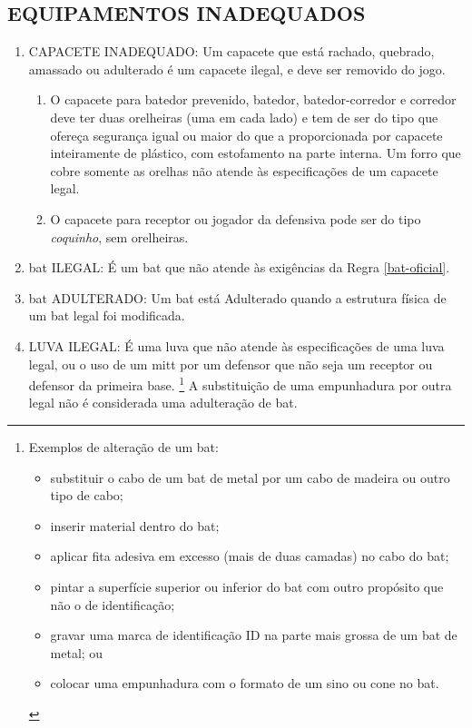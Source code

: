 	\subsection{EQUIPAMENTOS INADEQUADOS}
	\begin{enumerate}
		\item CAPACETE INADEQUADO:
			Um capacete que est\'a rachado, quebrado, amassado ou adulterado \'e um capacete ilegal, e deve ser removido do jogo. 
		
		\begin{enumerate}[label=\alph*)]
			\item O capacete para batedor prevenido, batedor, batedor-corredor e corredor deve ter duas orelheiras (uma em cada lado) e tem de ser do tipo que ofere\c{c}a seguran\c{c}a igual ou maior do que a proporcionada por capacete inteiramente de pl\'astico, com estofamento na parte interna. Um forro que cobre somente as orelhas n\~ao atende \`as especifica\c{c}\~oes de um capacete legal. 
			
			\item  O capacete para receptor ou jogador da defensiva pode ser do tipo \textit{coquinho}, sem orelheiras. 
		\end{enumerate}

	\item \Gls{bat} ILEGAL: 
	\'E um \gls{bat} que n\~ao atende \`as exig\^encias da Regra \ref{bat-oficial}. 

		\item \Gls{bat} ADULTERADO: 
		Um \gls{bat} est\'a Adulterado quando a estrutura f\'isica de um \gls{bat} legal foi modificada.
		
		\item LUVA ILEGAL:
		{\color{red!80}\'E uma luva que n\~ao atende \`as especifica\c{c}\~oes de uma luva legal, ou o uso de um \gls{mitt} por um defensor que n\~ao seja um receptor ou defensor da primeira base. }
		\footnote{
			Exemplos de altera\c{c}\~ao de um \gls{bat}: 
			\begin{itemize}
				\item substituir o cabo de um \gls{bat} de metal por um cabo de madeira ou outro tipo de cabo; 
				\item inserir material dentro do \gls{bat}; 
				\item aplicar fita adesiva em excesso (mais de duas camadas) no cabo do \gls{bat}; 
				\item pintar a superf\'icie superior ou inferior do \gls{bat} com outro prop\'osito que n\~ao o de identifica\c{c}\~ao;
				\item gravar uma marca de identifica\c{c}\~ao \gls{ID} na parte mais grossa de um \gls{bat} de metal; ou 
				\item colocar uma empunhadura com o formato de um sino ou cone no \gls{bat}. 
		\end{itemize}}
		A substitui\c{c}\~ao de uma empunhadura por outra legal n\~ao \'e considerada uma adultera\c{c}\~ao de \gls{bat}. 
		

\end{enumerate}
